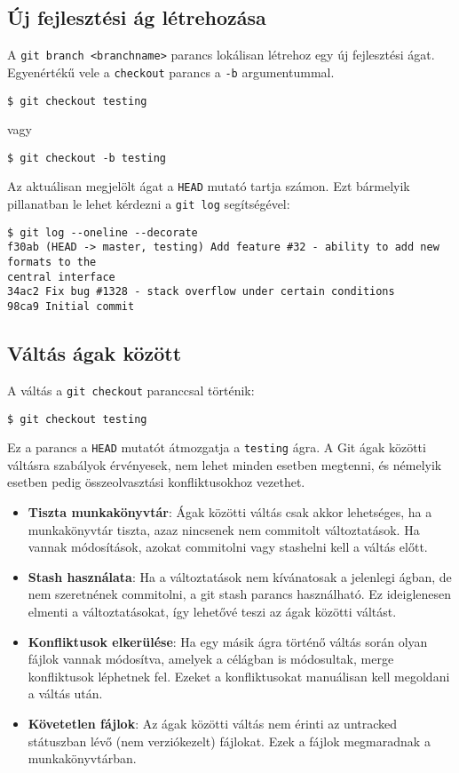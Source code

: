 \documentclass{article}
\begin{document}
\subsection*{Új fejlesztési ág létrehozása}
A \texttt{git branch <branchname>} parancs lokálisan létrehoz egy új fejlesztési ágat. Egyenértékű vele a \texttt{checkout} parancs a \texttt{-b} argumentummal.
\begin{lstlisting}
$ git checkout testing
\end{lstlisting}
vagy
\begin{lstlisting}
$ git checkout -b testing
\end{lstlisting}
Az aktuálisan megjelölt ágat a \texttt{HEAD} mutató tartja számon. Ezt bármelyik pillanatban le lehet kérdezni a \texttt{git log} segítségével:
\begin{lstlisting}
$ git log --oneline --decorate
f30ab (HEAD -> master, testing) Add feature #32 - ability to add new formats to the
central interface
34ac2 Fix bug #1328 - stack overflow under certain conditions
98ca9 Initial commit
\end{lstlisting}

\subsection*{Váltás ágak között}
A váltás a \texttt{git checkout} paranccsal történik:
\begin{lstlisting}
$ git checkout testing
\end{lstlisting}
Ez a parancs a \texttt{HEAD} mutatót átmozgatja a \texttt{testing} ágra.
\vspace{0.3cm}
A Git ágak közötti váltásra szabályok érvényesek, nem lehet minden esetben megtenni, és némelyik esetben pedig összeolvasztási konfliktusokhoz vezethet.
\begin{itemize}
    \item \textbf{Tiszta munkakönyvtár}: Ágak közötti váltás csak akkor lehetséges, ha a munkakönyvtár tiszta, azaz nincsenek nem commitolt változtatások. Ha vannak módosítások, azokat commitolni vagy stashelni kell a váltás előtt.

    \item \textbf{Stash használata}: Ha a változtatások nem kívánatosak a jelenlegi ágban, de nem szeretnének commitolni, a git stash parancs használható. Ez ideiglenesen elmenti a változtatásokat, így lehetővé teszi az ágak közötti váltást.

    \item \textbf{Konfliktusok elkerülése}: Ha egy másik ágra történő váltás során olyan fájlok vannak módosítva, amelyek a célágban is módosultak, merge konfliktusok léphetnek fel. Ezeket a konfliktusokat manuálisan kell megoldani a váltás után.

    \item \textbf{Követetlen fájlok}: Az ágak közötti váltás nem érinti az untracked státuszban lévő (nem verziókezelt) fájlokat. Ezek a fájlok megmaradnak a munkakönyvtárban.
\end{itemize}
\end{document}
